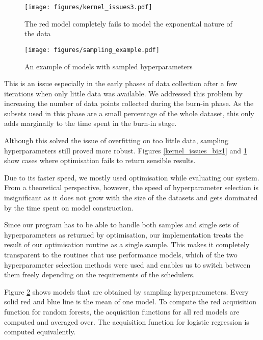 \documentclass[a4paper,12pt,twoside,openright]{report}
\begin{document}
\begin{figure}[p]
\centering
  \texttt{[image: figures/kernel\_issues3.pdf]}
  \caption{The red model completely fails to model the exponential nature of the data}
  \label{kernel_issues3}
\end{figure}

\begin{figure}[p]
\centering
  \texttt{[image: figures/sampling\_example.pdf]}
  \caption{An example of models with sampled hyperparameters}
  \label{sampling_example}
\end{figure}

This is an issue especially in the early phases of data collection after a few iterations when only little data was available. We addressed this problem by increasing the number of data points collected during the burn-in phase. As the subsets used in this phase are a small percentage of the whole dataset, this only adds marginally to the time spent in the burn-in stage.

Although this solved the issue of overfitting on too little data, sampling hyperparameters still proved more robust. Figures \ref{kernel_issues_big1} and \ref{kernel_issues3} show cases where optimisation fails to return sensible results.

Due to its faster speed, we mostly used optimisation while evaluating our system. From a theoretical perspective, however, the speed of hyperparameter selection is insignificant as it does not grow with the size of the datasets and gets dominated by the time spent on model construction.

Since our program has to be able to handle both samples and single sets of hyperparameters as returned by optimisation, our implementation treats the result of our optimisation routine as a single sample. This makes it completely transparent to the routines that use performance models, which of the two hyperparameter selection methods were used and enables us to switch between them freely depending on the requirements of the schedulers.

Figure \ref{sampling_example} shows models that are obtained by sampling hyperparameters. Every solid red and blue line is the mean of one model. To compute the red acquisition function for random forests, the acquisition functions for all red models are computed and averaged over. The acquisition function for logistic regression is computed equivalently.
\end{document}
